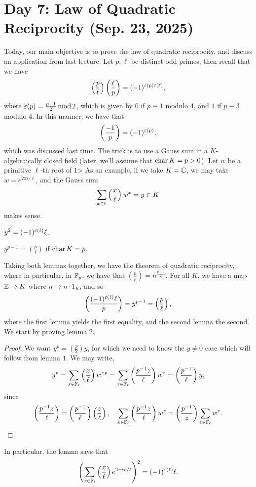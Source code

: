 \section{Day 7: Law of Quadratic Reciprocity (Sep. 23, 2025)}
Today, our main objective is to prove the law of quadratic reciprocity, and discuss an application from last lecture. Let $p, \ell$ be distinct odd primes; then recall that we have
\[ \left(\frac{p}{\ell}\right) \left(\frac{\ell}{p}\right) = (-1)^{\varepsilon(p) \varepsilon(\ell)}, \]
where $\varepsilon(p) = \frac{p-1}{2} \operatorname{mod} 2$, which is given by $0$ if $p \equiv 1$ modulo $4$, and $1$ if $p \equiv 3$ modulo $4$. In this manner, we have that
\[ \left(\frac{-1}{p}\right) = (-1)^{\varepsilon(p)}, \]
which was discussed last time. The trick is to use a Gauss sum in a $K$-algebraically closed field (later, we'll assume that $\operatorname{char} K = p > 0$). Let $w$ be a primitive $\ell$-th root of $1$> As an example, if we take $K = \mathbb C$, we may take $w = e^{2\pi i/\ell}$, and the Gauss sum
\[ \sum_{x \in \mathbb F} \left(\frac{x}{\ell}\right) w^x = y \in K \]
makes sense.
\begin{lemma}
    $y^2 = (-1)^{\varepsilon(\ell)} \ell$.
\end{lemma}
\begin{lemma}
    $y^{p-1} = (\frac{p}{\ell})$ if $\operatorname{char} K = p$.
\end{lemma}
\noindent Taking both lemmas together, we have the theorem of quadratic reciprocity, where in particular, in $\mathbb F_p$, we have that $(\frac{n}{p}) = n^{\frac{p-1}{2}}$. For all $K$, we have a map $\mathbb Z \to K$ where $n \mapsto n \cdot 1_K$, and so
\[ \left(\frac{(-1)^{\varepsilon(\ell)} \ell}{p}\right) = y^{p - 1} = \left(\frac{p}{\ell}\right), \]
where the first lemma yields the first equality, and the second lemma the second. We start by proving lemma $2$.
\begin{proof}
    We want $y^p = (\frac{p}{2}) y$, for which we need to know the $y \neq 0$ case which will follow from lemma $1$. We may write,
    \[ y^p = \sum_{x \in \mathbb F_\ell} \left(\frac{x}{\ell}\right) w^{xp} = \sum_{x \in \mathbb F_\ell} \left(\frac{p^{-1} z}{\ell}\right) w^z = \left(\frac{p^{-1}}{\ell}\right) y, \]
    since
    \[ \left(\frac{p^{-1} z}{\ell}\right) = \left(\frac{p^{-1}}{\ell}\right)\left(\frac{z}{\ell}\right), \quad \sum_{x \in \mathbb F_\ell} \left(\frac{p^{-1} z}{\ell}\right) w^z = \left(\frac{p^{-1}}{z}\right) \sum_{z \in \mathbb F_\ell} w^z. \]
\end{proof}
\noindent In particular, the lemma says that
\[ \left(\sum_{x \in \mathbb F_\ell} \left(\frac{x}{\ell}\right) e^{2 \pi i x / \ell}\right)^2 = (-1)^{\varepsilon(\ell)} \ell. \]
